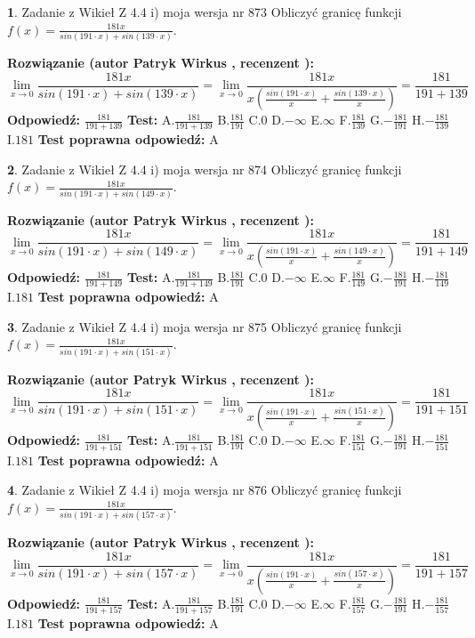\documentclass[12pt, a4paper]{article}
\theoremstyle{definition} %
\newtheorem{zad}{}
\newcommand{\zadStart}[1]{\begin{zad}#1\newline}
\newcommand{\zadStop}{\end{zad}}
\newcommand{\rozwStart}[2]{\noindent \textbf{Rozwiązanie (autor #1 , recenzent #2): }\newline}
\newcommand{\rozwStop}{\newline}
\newcommand{\odpStart}{\noindent \textbf{Odpowiedź:}\newline}
\newcommand{\odpStop}{\newline}
\newcommand{\testStart}{\noindent \textbf{Test:}\newline}
\newcommand{\testStop}{\newline}
\newcommand{\kluczStart}{\noindent \textbf{Test poprawna odpowiedź:}\newline}
\newcommand{\kluczStop}{\newline}
\begin{document}
\zadStart{Zadanie z Wikieł Z 4.4 i) moja wersja nr 873}
Obliczyć granicę funkcji $f(x)=\frac{181x}{sin(191\cdot x) +sin(139\cdot x)}$.
\zadStop
\rozwStart{Patryk Wirkus}{}
$$\lim\limits_{x\to 0}\frac{181x}{sin(191\cdot x) +sin(139\cdot x)}=\lim\limits_{x\to 0}\frac{181x}{x(\frac{sin(191\cdot x)}{x}+\frac{sin(139\cdot x)}{x})}=\frac{181}{191+139}$$
\rozwStop
\odpStart
$\frac{181}{191+139}$
\odpStop
\testStart
A.$\frac{181}{191+139}$
B.$\frac{181}{191}$
C.$0$
D.$-\infty$
E.$\infty$
F.$\frac{181}{139}$
G.$-\frac{181}{191}$
H.$-\frac{181}{139}$
I.$181$
\testStop
\kluczStart
A
\kluczStop



\zadStart{Zadanie z Wikieł Z 4.4 i) moja wersja nr 874}
Obliczyć granicę funkcji $f(x)=\frac{181x}{sin(191\cdot x) +sin(149\cdot x)}$.
\zadStop
\rozwStart{Patryk Wirkus}{}
$$\lim\limits_{x\to 0}\frac{181x}{sin(191\cdot x) +sin(149\cdot x)}=\lim\limits_{x\to 0}\frac{181x}{x(\frac{sin(191\cdot x)}{x}+\frac{sin(149\cdot x)}{x})}=\frac{181}{191+149}$$
\rozwStop
\odpStart
$\frac{181}{191+149}$
\odpStop
\testStart
A.$\frac{181}{191+149}$
B.$\frac{181}{191}$
C.$0$
D.$-\infty$
E.$\infty$
F.$\frac{181}{149}$
G.$-\frac{181}{191}$
H.$-\frac{181}{149}$
I.$181$
\testStop
\kluczStart
A
\kluczStop



\zadStart{Zadanie z Wikieł Z 4.4 i) moja wersja nr 875}
Obliczyć granicę funkcji $f(x)=\frac{181x}{sin(191\cdot x) +sin(151\cdot x)}$.
\zadStop
\rozwStart{Patryk Wirkus}{}
$$\lim\limits_{x\to 0}\frac{181x}{sin(191\cdot x) +sin(151\cdot x)}=\lim\limits_{x\to 0}\frac{181x}{x(\frac{sin(191\cdot x)}{x}+\frac{sin(151\cdot x)}{x})}=\frac{181}{191+151}$$
\rozwStop
\odpStart
$\frac{181}{191+151}$
\odpStop
\testStart
A.$\frac{181}{191+151}$
B.$\frac{181}{191}$
C.$0$
D.$-\infty$
E.$\infty$
F.$\frac{181}{151}$
G.$-\frac{181}{191}$
H.$-\frac{181}{151}$
I.$181$
\testStop
\kluczStart
A
\kluczStop



\zadStart{Zadanie z Wikieł Z 4.4 i) moja wersja nr 876}
Obliczyć granicę funkcji $f(x)=\frac{181x}{sin(191\cdot x) +sin(157\cdot x)}$.
\zadStop
\rozwStart{Patryk Wirkus}{}
$$\lim\limits_{x\to 0}\frac{181x}{sin(191\cdot x) +sin(157\cdot x)}=\lim\limits_{x\to 0}\frac{181x}{x(\frac{sin(191\cdot x)}{x}+\frac{sin(157\cdot x)}{x})}=\frac{181}{191+157}$$
\rozwStop
\odpStart
$\frac{181}{191+157}$
\odpStop
\testStart
A.$\frac{181}{191+157}$
B.$\frac{181}{191}$
C.$0$
D.$-\infty$
E.$\infty$
F.$\frac{181}{157}$
G.$-\frac{181}{191}$
H.$-\frac{181}{157}$
I.$181$
\testStop
\kluczStart
A
\kluczStop
\end{document}
